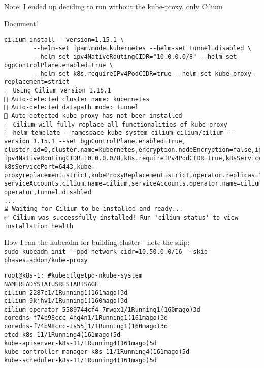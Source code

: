 \documentclass[Screen16to9,17pt]{foils}
\begin{document}
\begin{list2}
\item Note: I ended up deciding to run without the kube-proxy, only Cilium
\item Document!
\end{list2}




\begin{verbatim}
cilium install --version=1.15.1 \
		--helm-set ipam.mode=kubernetes --helm-set tunnel=disabled \
		--helm-set ipv4NativeRoutingCIDR="10.0.0.0/8" --helm-set bgpControlPlane.enabled=true \
		--helm-set k8s.requireIPv4PodCIDR=true --helm-set kube-proxy-replacement=strict
ℹ️  Using Cilium version 1.15.1
🔮 Auto-detected cluster name: kubernetes
🔮 Auto-detected datapath mode: tunnel
🔮 Auto-detected kube-proxy has not been installed
ℹ️  Cilium will fully replace all functionalities of kube-proxy
ℹ️  helm template --namespace kube-system cilium cilium/cilium --version 1.15.1 --set bgpControlPlane.enabled=true,
cluster.id=0,cluster.name=kubernetes,encryption.nodeEncryption=false,ipam.mode=kubernetes,
ipv4NativeRoutingCIDR=10.0.0.0/8,k8s.requireIPv4PodCIDR=true,k8sServiceHost=10.137.0.26,
k8sServicePort=6443,kube-proxyreplacement=strict,kubeProxyReplacement=strict,operator.replicas=1,
serviceAccounts.cilium.name=cilium,serviceAccounts.operator.name=cilium-operator,tunnel=disabled
...
⌛ Waiting for Cilium to be installed and ready...
✅ Cilium was successfully installed! Run 'cilium status' to view installation health
\end{verbatim}


How I ran the kubeadm for building cluster - note the skip:\\
\verb+sudo kubeadm init --pod-network-cidr=10.50.0.0/16 --skip-phases=addon/kube-proxy+

\slide{After install Cilium}

\begin{alltt}\footnotesize
root@k8s-1:~# kubectl get po -n kube-system
NAME                               READY   STATUS    RESTARTS       AGE
cilium-2287c                       1/1     Running   1 (161m ago)   3d
cilium-9kjhv                       1/1     Running   1 (160m ago)   3d
cilium-operator-5589744cf4-7mwqx   1/1     Running   1 (160m ago)   3d
coredns-f74b98ccc-4hg4n            1/1     Running   1 (161m ago)   3d
coredns-f74b98ccc-ts55j            1/1     Running   1 (160m ago)   3d
etcd-k8s-1                         1/1     Running   4 (161m ago)   5d
kube-apiserver-k8s-1               1/1     Running   4 (161m ago)   5d
kube-controller-manager-k8s-1      1/1     Running   4 (161m ago)   5d
kube-scheduler-k8s-1               1/1     Running   4 (161m ago)   5d
\end{alltt}
\end{document}
